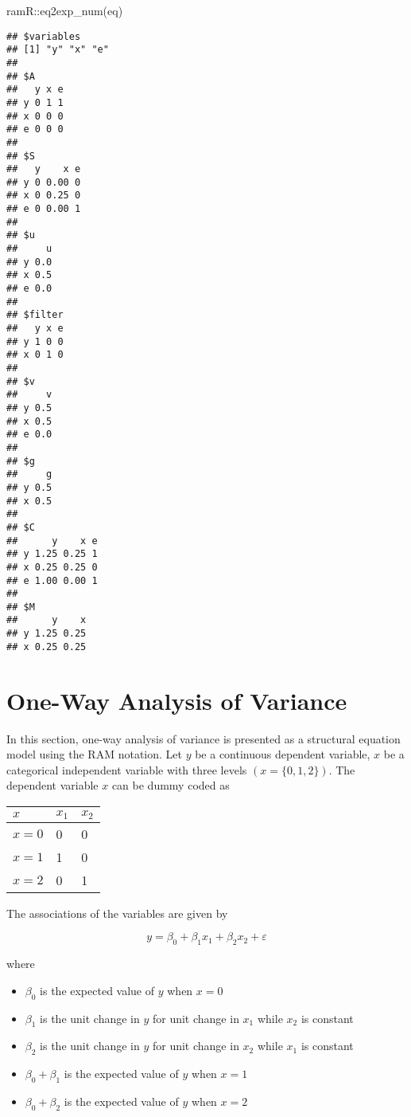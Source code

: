 \documentclass[
]{book}
\newenvironment{Shaded}{\begin{snugshade}}{\end{snugshade}}
\newcommand{\FunctionTok}[1]{\textcolor[rgb]{0.00,0.00,0.00}{#1}}
\newcommand{\NormalTok}[1]{#1}
\newcommand{\SpecialCharTok}[1]{\textcolor[rgb]{0.00,0.00,0.00}{#1}}
\providecommand{\tightlist}{%
  \setlength{\itemsep}{0pt}\setlength{\parskip}{0pt}}
\theoremstyle{definition}
\theoremstyle{definition}
\theoremstyle{definition}
\theoremstyle{remark}
\begin{document}
\begin{Shaded}
\begin{Highlighting}[]
\NormalTok{ramR}\SpecialCharTok{::}\FunctionTok{eq2exp\_num}\NormalTok{(eq)}
\end{Highlighting}
\end{Shaded}

\begin{verbatim}
## $variables
## [1] "y" "x" "e"
## 
## $A
##   y x e
## y 0 1 1
## x 0 0 0
## e 0 0 0
## 
## $S
##   y    x e
## y 0 0.00 0
## x 0 0.25 0
## e 0 0.00 1
## 
## $u
##     u
## y 0.0
## x 0.5
## e 0.0
## 
## $filter
##   y x e
## y 1 0 0
## x 0 1 0
## 
## $v
##     v
## y 0.5
## x 0.5
## e 0.0
## 
## $g
##     g
## y 0.5
## x 0.5
## 
## $C
##      y    x e
## y 1.25 0.25 1
## x 0.25 0.25 0
## e 1.00 0.00 1
## 
## $M
##      y    x
## y 1.25 0.25
## x 0.25 0.25
\end{verbatim}

\hypertarget{ram-anova}{%
\chapter{One-Way Analysis of Variance}\label{ram-anova}}

In this section,
one-way analysis of variance is presented as a structural equation model
using the RAM notation.
Let \(y\) be a continuous dependent variable,
\(x\) be a categorical independent variable
with three levels
\(\left( x = \{0, 1, 2\} \right)\).
The dependent variable \(x\) can be dummy coded as

\begin{tabular}{l|l|l}
\hline
$x$ & $x_1$ & $x_2$\\
\hline
$x = 0$ & 0 & 0\\
\hline
$x = 1$ & 1 & 0\\
\hline
$x = 2$ & 0 & 1\\
\hline
\end{tabular}

The associations of the variables are given by

\begin{equation*}
  y
  =
  \beta_0 + \beta_1 x_1 + \beta_2 x_2 + \varepsilon
\end{equation*}

\noindent where

\begin{itemize}
\tightlist
\item
  \(\beta_0\) is the expected value of \(y\) when \(x = 0\)
\item
  \(\beta_1\) is the unit change in \(y\) for unit change in \(x_1\) while \(x_2\) is constant
\item
  \(\beta_2\) is the unit change in \(y\) for unit change in \(x_2\) while \(x_1\) is constant
\item
  \(\beta_0 + \beta_1\) is the expected value of \(y\) when \(x = 1\)
\item
  \(\beta_0 + \beta_2\) is the expected value of \(y\) when \(x = 2\)
\end{itemize}
\end{document}
